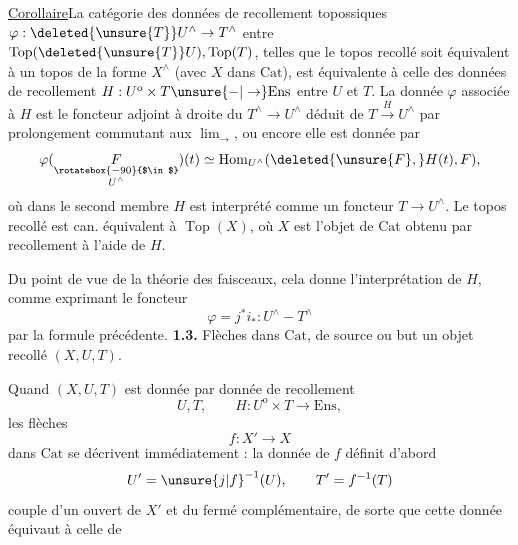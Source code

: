 \uline{Corollaire}\quad La catégorie des données de recollement
topossiques $\varphi:\deleted{\unsure{T}}U^\wedge\to T^\wedge$ entre $\operatorname{Top}(\deleted{\unsure{T}}U),\operatorname{Top}(T)$,
telles que  le topos recollé soit  équivalent à
un topos de la forme $X^\wedge$ (avec $X$ dans $\mathrm{Cat}$),
est équivalente à celle des données de recollement
$H:U^{\mathrm o}\times T\unsure{-|\to}\mathrm{Ens}$ entre $U$ et $T$.  La
 donnée  $\varphi$ associée à $H$ est le foncteur adjoint
à droite du $T^\wedge\longrightarrow U^\wedge$ déduit de $T\xrightarrow{H}U^\wedge$
par prolongement commutant aux $\lim_{\rightarrow}$, ou encore
elle est donnée par
\[
\varphi(\underset{\substack{\rotatebox{-90}{$\in$}\\U^\wedge}}{F})(t)
\simeq\operatorname{Hom}_{U^\wedge}(\deleted{\unsure{F},}H(t),F),
\]
où dans le second membre $H$ est interprété comme
un foncteur $T\longrightarrow U^\wedge$. Le topos recollé
 est can. équivalent à $\operatorname{Top}(X)$, où $X$ est
l'objet de $\mathrm{Cat}$ obtenu par recollement à l'aide
de $H$.

Du point de vue de la théorie des faisceaux,
cela donne l'interprétation de $H$, comme
exprimant le foncteur
\[
\varphi=j^*i_*:U^\wedge-T^\wedge
\]
par la formule précédente.
\textbf{1.3.}\quad {} Flèches dans $\mathrm{Cat}$, de source ou but un objet
recollé $(X,U,T)$.

Quand $(X,U,T)$ est donnée par  donnée de
recollement
\[
U,T,\qquad H:U^{\mathrm o}\times T\longrightarrow\mathrm{Ens},
\]
les  flèches
\[
f:X'\longrightarrow X
\]
dans $\mathrm{Cat}$ se décrivent immédiatement  : 
la donnée de $f$ définit d'abord
\[
U'=\unsure{j|f}^{-1}(U),\qquad T'=f^{-1}(T)
\]
couple d'un ouvert de $X'$ et du fermé complémentaire,
 de sorte que cette  donnée équivaut
à celle de

